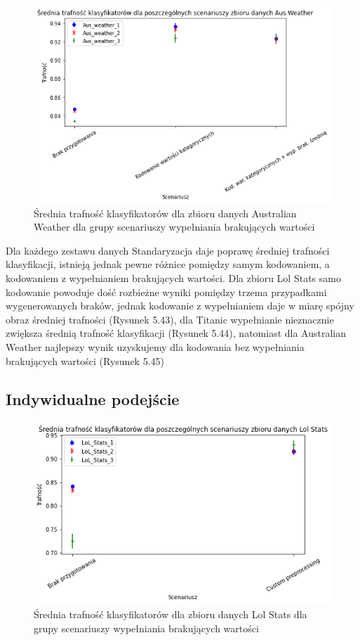 \documentclass{book}
\begin{document}
\begin{figure}[H]
    \centerline{\includegraphics[scale=0.5]{Aus_Weather_Avg_Kodowanie}}
    \centering
    \caption{Średnia trafność klasyfikatorów dla zbioru danych Australian Weather 
    dla grupy scenariuszy wypełniania brakujących wartości}
    \end{figure}

    Dla każdego zestawu danych Standaryzacja daje poprawę 
    średniej trafności klasyfikacji, istnieją jednak pewne 
    różnice pomiędzy samym kodowaniem, a kodowaniem z 
    wypełnianiem brakujących wartości. Dla zbioru Lol 
    Stats samo kodowanie powoduje dość rozbieżne wyniki 
    pomiędzy trzema przypadkami wygenerowanych braków, 
    jednak kodowanie z wypełnianiem daje w miarę spójny 
    obraz średniej trafności (Rysunek 5.43), dla Titanic 
    wypełnianie nieznacznie zwiększa średnią trafność 
    klasyfikacji (Rysunek 5.44), natomiast dla Australian Weather
    najlepszy wynik uzyskujemy dla kodowania bez wypełniania brakujących wartości (Rysunek 5.45)

\subsection{Indywidualne podejście}

\begin{figure}[H]
    \centerline{\includegraphics[scale=0.5]{Lol_Stats_Avg_Custom}}
    \centering
    \caption{Średnia trafność klasyfikatorów dla zbioru danych Lol Stats 
    dla grupy scenariuszy wypełniania brakujących wartości}
    \end{figure}
\end{document}
